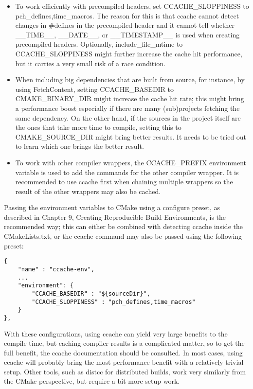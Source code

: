 \begin{itemize}
\item 
To work efficiently with precompiled headers, set CCACHE\_SLOPPINESS to pch\_defines,time\_macros. The reason for this is that ccache cannot detect changes in \#defines in the precompiled header and it cannot tell whether \_\_TIME\_\_, \_\_DATE\_\_, or \_\_TIMESTAMP\_\_ is used when creating precompiled headers. Optionally, include\_file\_mtime to CCACHE\_SLOPPINESS might further increase the cache hit performance, but it carries a very small risk of a race condition.

\item 
When including big dependencies that are built from source, for instance, by using FetchContent, setting CCACHE\_BASEDIR to CMAKE\_BINARY\_DIR might increase the cache hit rate; this might bring a performance boost especially if there are many (sub)projects fetching the same dependency. On the other hand, if the sources in the project itself are the ones that take more time to compile, setting this to CMAKE\_SOURCE\_DIR might bring better results. It needs to be tried out to learn which one brings the better result.

\item 
To work with other compiler wrappers, the CCACHE\_PREFIX environment variable is used to add the commands for the other compiler wrapper. It is recommended to use ccache first when chaining multiple wrappers so the result of the other wrappers may also be cached.
\end{itemize}

Passing the environment variables to CMake using a configure preset, as described in Chapter 9, Creating Reproducible Build Environments, is the recommended way; this can either be combined with detecting ccache inside the CMakeLists.txt, or the ccache command may also be passed using the following preset:

\begin{lstlisting}[style=styleCMake]
{
	"name" : "ccache-env",
	...
	"environment": {
		"CCACHE_BASEDIR" : "${sourceDir}",
		"CCACHE_SLOPPINESS" : "pch_defines,time_macros"
	}
},
\end{lstlisting}

With these configurations, using ccache can yield very large benefits to the compile time, but caching compiler results is a complicated matter, so to get the full benefit, the ccache documentation should be consulted. In most cases, using ccache will probably bring the most performance benefit with a relatively trivial setup. Other tools, such as distcc for distributed builds, work very similarly from the CMake perspective, but require a bit more setup work.


